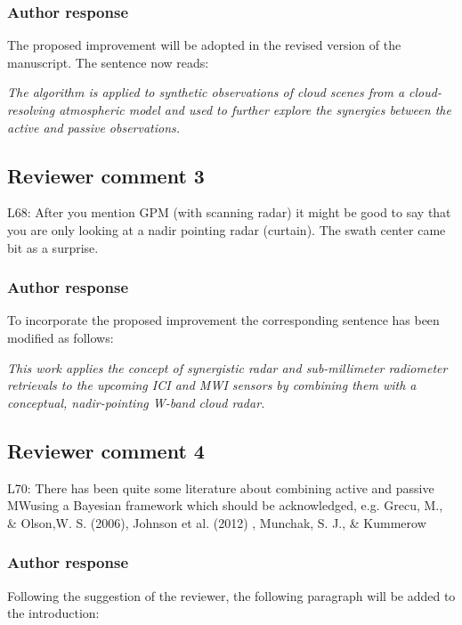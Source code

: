 \documentclass[11pt]{scrartcl}
\begin{document}
\subsubsection*{Author response}

The proposed improvement will be adopted in the revised version of the manuscript.
The sentence now reads:

\textit{The algorithm is applied to synthetic observations of cloud scenes from
  a cloud-resolving atmospheric model and used to further explore the synergies
  between the active and passive observations.}


\textit{}

\subsection*{Reviewer comment 3}

L68:  After you mention GPM (with scanning radar) it might be good to say that you are only looking at a nadir pointing radar (curtain).  The swath center came bit as a surprise.

\subsubsection*{Author response}

To incorporate the proposed improvement the corresponding sentence has been
modified as follows:

\textit{This work applies the concept of synergistic radar and sub-millimeter radiometer
retrievals to the upcoming ICI and MWI sensors by combining them with a
conceptual, nadir-pointing W-band cloud radar.}

\subsection*{Reviewer comment 4}

L70:  There has been quite some literature about combining active and passive MWusing a Bayesian framework which should be acknowledged, e.g. Grecu, M., & Olson,W. S. (2006), Johnson et al. (2012) , Munchak, S. J., & Kummerow

\subsubsection*{Author response}

Following the suggestion of the reviewer, the following paragraph will be added to the introduction:
\end{document}
